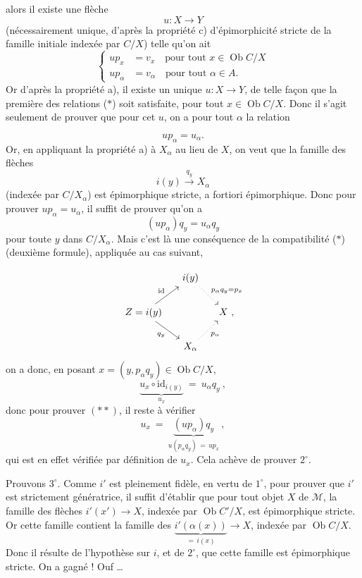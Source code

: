 \documentclass[11pt]{article}
\newcommand{\printedpage}[1]{\marginpar{\footnotesize p.~#1}}
\newcommand{\msp}[1]{\marginpar{\footnotesize [#1]}}
\newcommand{\Ob}{\operatorname{Ob}}
\begin{document}
alors il existe une flèche
\[ u : X \longrightarrow Y \]
(nécessairement unique, d'après la propriété c) d'épimorphicité stricte de la famille initiale indexée par $C/X$) telle qu'on ait
\[ \left\{\begin{aligned}
up_x &= v_x \quad \text{pour tout } x \in \Ob C/X\\ %
up_\alpha &= v_\alpha \quad \text{pour tout } \alpha \in A. %
\end{aligned}\right. \tag*{($*$)} \]
Or d'après la propriété a), il existe un unique $u : X \longrightarrow Y$, de telle façon que la première des relations ($*$) soit satisfaite, pour tout $x \in \Ob C/X$. Donc il s'agit seulement de prouver que pour cet $u$, on a pour tout $\alpha$ la relation

\msp{page 196}
\[ up_\alpha = u_\alpha . \]
Or, en appliquant la propriété a) à $X_\alpha$ au lieu de $X$, on veut que la famille des flèches %
\[ i(y) \xrightarrow{q_y} X_\alpha \]
(indexée par $C/X_\alpha$) est épimorphique stricte, a fortiori épimorphique. Donc pour prouver $up_\alpha = u_\alpha$, il suffit de prouver qu'on a
\[ (up_\alpha)q_y = u_\alpha q_y \tag*{($**$)} \]
pour toute $y$ dans $C/X_\alpha$. Mais c'est là une conséquence de la compatibilité ($*$) (deuxième formule), appliquée au cas suivant,

\printedpage{69}

\[
\begin{tikzcd}[column sep=small]
 & i(y) \arrow[dr, dotted, "p_\alpha q_y=p_x"] & \\
Z=i(y) \arrow[ur, "\mathrm{id}"] \arrow[dr, "q_y"'] & & X \ , \\
 & X_\alpha \arrow[ur, dotted, "p_\alpha"'] &
\end{tikzcd}
\]
on a donc, en posant $x=(y,p_\alpha q_y)\in\Ob C/X$,
\[
\underbrace{u_x\circ\mathrm{id}_{i(y)}}_{u_x} \ = \ u_\alpha q_y \ ,
\]
donc pour prouver $(**)$, il reste à vérifier
\[
u_x \ = \ \underbrace{(up_\alpha)q_y}_{u(p_\alpha q_y)\,=\,up_x} \ ,
\]
\msp{page 197}
qui est en effet vérifiée par définition de $u_x$. Cela achève de prouver $2^\circ$.

Prouvons $3^\circ$. Comme $i'$ est pleinement fidèle, en vertu de $1^\circ$, pour prouver que $i'$ est strictement génératrice, il suffit d'établir que pour tout objet $X$ de $\mathcal{M}$, la famille des flèches $i'(x')\longrightarrow X$, indexée par $\Ob C'/X$, est épimorphique stricte. Or cette famille contient la famille des $\underbrace{i'(\alpha(x))}_{=\,i(x)}\longrightarrow X$, indexée par $\Ob C/X$. Donc il résulte de l'hypothèse sur $i$, et de $2^\circ$, que cette famille est épimorphique stricte. On a gagné ! Ouf \dots
\end{document}
